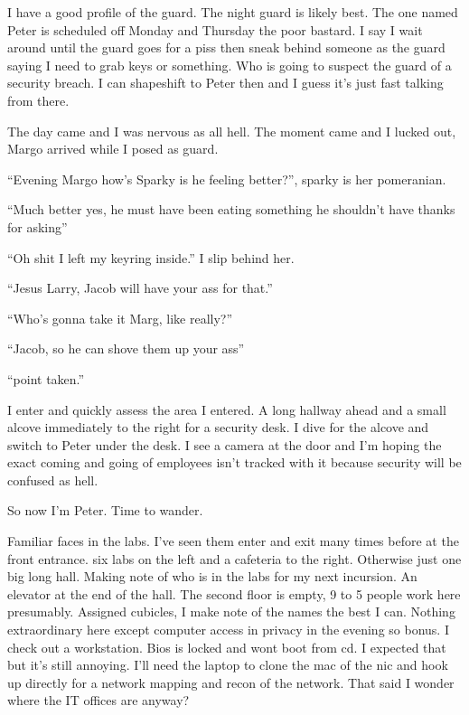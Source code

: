 I have a good profile of the guard. The night guard is likely best. The one named Peter is scheduled off Monday and Thursday the poor bastard. I say I wait around until the guard goes for a piss then sneak behind someone as the guard saying I need to grab keys or something. Who is going to suspect the guard of a security breach. I can shapeshift to Peter then and I guess it's just fast talking from there.

The day came and I was nervous as all hell. The moment came and I lucked out, Margo arrived while I posed as guard.

``Evening Margo how's Sparky is he feeling better?'', sparky is her pomeranian.

``Much better yes, he must have been eating something he shouldn't have thanks for asking''

``Oh shit I left my keyring inside.'' I slip behind her.

``Jesus Larry, Jacob will have your ass for that.''

``Who's gonna take it Marg, like really?''

``Jacob, so he can shove them up your ass''

``point taken.''

I enter and quickly assess the area I entered. A long hallway ahead and a small alcove immediately to the right for a security desk. I dive for the alcove and switch to Peter under the desk. I see a camera at the door and I'm hoping the exact coming and going of employees isn't tracked with it because security will be confused as hell.

So now I'm Peter. Time to wander.

Familiar faces in the labs. I've seen them enter and exit many times before at the front entrance. six labs on the left and a cafeteria to the right. Otherwise just one big long hall. Making note of who is in the labs for my next incursion. An elevator at the end of the hall. The second floor is empty, 9 to 5 people work here presumably. Assigned cubicles, I make note of the names the best I can. Nothing extraordinary here except computer access in privacy in the evening so bonus. I check out a workstation. Bios is locked and wont boot from cd. I expected that but it's still annoying. I'll need the laptop to clone the mac of the nic and hook up directly for a network mapping and recon of the network. That said I wonder where the IT offices are anyway?

